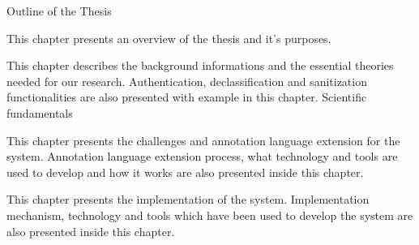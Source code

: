 \clearemptydoublepage

{}

\begin{center}
	\huge{Outline of the Thesis}
\end{center}



  \vspace{1mm}

\noindent  This chapter presents an overview of the thesis and it's purposes. 

  \vspace{1mm}

\noindent  This chapter describes the background informations and the essential theories needed for our research. Authentication, declassification and sanitization functionalities are also presented with example in this chapter. Scientific fundamentals 


  \vspace{1mm}

\noindent  This chapter presents the challenges and annotation language extension for the system. Annotation language extension process, what technology and tools are used to develop and how it works are also presented inside this chapter.

  \vspace{1mm}

\noindent  This chapter presents the implementation of the system. Implementation mechanism, technology and tools which have been used to develop the system are also presented inside this chapter.

  \vspace{1mm}

